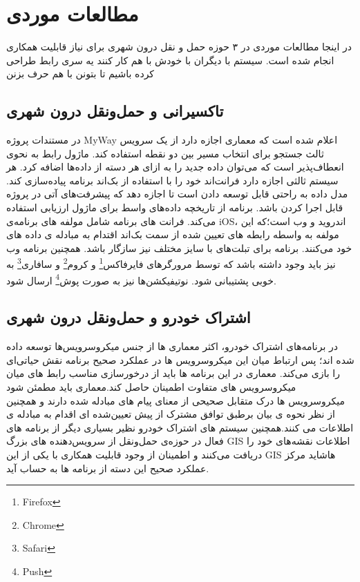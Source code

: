 \section{مطالعات موردی}
در اینجا مطالعات موردی در ۳ حوزه حمل و نقل درون شهری برای نیاز قابلیت همکاری انجام شده است. 
سیستم با دیگران
با خودش 
با هم کار کنند 
یه سری رابط طراحی کرده باشیم تا بتونن با هم حرف بزنن 

\subsection{تاکسیرانی و حمل‌و‌نقل درون شهری}

در مستندات پروژه MyWay اعلام شده است که معماری اجازه دارد از یک سرویس ثالث جستجو برای انتخاب مسیر بین دو نقطه استفاده کند. ماژول رابط به نحوی انعطاف‌پذیر است که می‌توان داده جدید را به ازای هر دسته از داده‌ها اضافه کرد. هر سیستم ثالثی اجازه دارد فرانت‌اند خود را با استفاده از بک‌اند برنامه پیاده‌سازی کند. مدل داده به راحتی قابل توسعه دادن است تا اجازه دهد که پیشرفت‌های آتی در پروژه قابل اجرا کردن باشد. برنامه از تاریخچه داده‌های واسط برای ماژول ارزیابی استفاده می‌کند. فرانت های برنامه شامل مولفه های برنامه‌ی iOS، اندروید و وب است؛که این مولفه به واسطه رابطه های تعیین شده از سمت بک‌اند اقتدام به مبادله ی داده های خود می‌کنند. برنامه برای تبلت‌های با سایز مختلف نیز سازگار باشد. همچنین برنامه وب نیز باید وجود داشته باشد که توسط مرورگرهای فایرفاکس\footnote{Firefox} و کروم\footnote{Chrome} و سافاری\footnote{Safari} به خوبی پشتیبانی شود.
نوتیفیکشن‌ها نیز به صورت پوش\footnote{Push} ارسال شود.

\subsection{اشتراک خودرو و حمل‌و‌نقل درون شهری}
در برنامه‌ها‌ی اشتراک خودرو، اکثر معماری ها از جنس میکروسرویس‌ها توسعه داده شده اند؛ پس ارتباط میان این میکروسرویس ها در عملکرد صحیح برنامه نقش حیاتی‌ای را بازی می‌کند. معماری در این برنامه ها باید از درخورسازی مناسب رابط های میان میکروسرویس های متفاوت اطمینان حاصل کند.معماری باید مطمئن شود میکروسرویس ها درک متقابل صحیحی از معنای پیام های مبادله شده دارند و همچنین از نظر نحوه ی بیان برطبق توافق مشترک از پیش تعیین‌شده ای اقدام به مبادله ی اطلاعات می کنند.همچنین سیستم های اشتراک خودرو نظیر بسیاری دیگر از برنامه های فعال در حوزه‌ی حمل‌و‌نقل از سرویس‌دهنده های بزرگ‌ GIS اطلاعات نقشه‌های خود را دریافت می‌کنند و اطمینان از وجود قابلیت همکاری با یکی از این GIS هاشاید مرکز عملکرد صحیح این دسته از برنامه ها به حساب آید.

